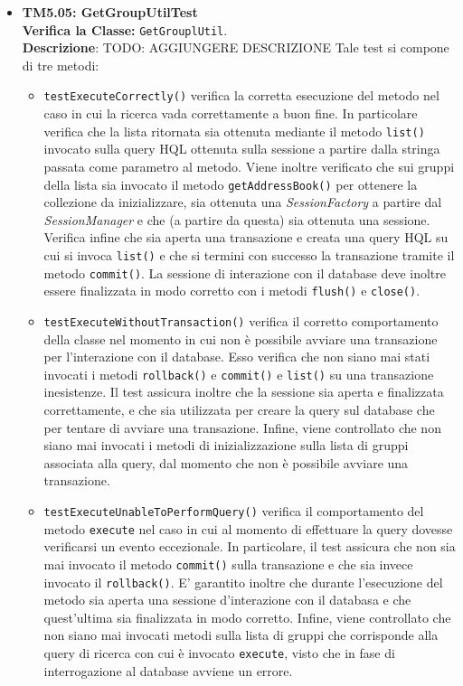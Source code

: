 \begin{itemize}
\item \textbf{TM5.05: GetGroupUtilTest}\\
\textbf{Verifica la Classe:} \texttt{GetGrouplUtil}.\\
\textbf{Descrizione}: TODO: AGGIUNGERE DESCRIZIONE
Tale test si compone di tre metodi:
\begin{itemize}
\item \texttt{testExecuteCorrectly()} verifica la corretta esecuzione del metodo nel caso in cui la ricerca vada correttamente a buon fine. In particolare verifica che la lista ritornata sia ottenuta mediante il metodo \texttt{list()} invocato sulla query HQL ottenuta sulla sessione a partire dalla stringa passata come parametro al metodo.
Viene inoltre verificato che sui gruppi della lista sia invocato il metodo \texttt{getAddressBook()} per ottenere la collezione da inizializzare, sia ottenuta una \textit{SessionFactory} a partire dal \textit{SessionManager} e che (a partire da questa) sia ottenuta una sessione.
Verifica infine che sia aperta una transazione e creata una query HQL su cui si invoca \texttt{list()} e che si termini con successo la transazione tramite il metodo \texttt{commit()}.
La sessione di interazione con il database deve inoltre essere finalizzata in modo corretto con i metodi \texttt{flush()} e \texttt{close()}.

\item \texttt{testExecuteWithoutTransaction()} verifica il corretto comportamento della classe nel momento in cui non è possibile avviare una transazione per l'interazione con il database. Esso verifica che non siano mai stati invocati i metodi \texttt{rollback()} e \texttt{commit()} e \texttt{list()} su una transazione inesistenze.
Il test assicura inoltre che la sessione sia aperta e finalizzata correttamente, e che sia utilizzata per creare la query sul database che per tentare di avviare una transazione.
Infine, viene controllato che non siano mai invocati i metodi di inizializzazione sulla lista di gruppi associata alla query, dal momento che non è possibile avviare una transazione.

\item \texttt{testExecuteUnableToPerformQuery()} verifica il comportamento del metodo \texttt{execute} nel caso in cui al momento di effettuare la query dovesse verificarsi un evento eccezionale. In particolare, il test assicura che non sia mai invocato il metodo \texttt{commit()} sulla transazione e che sia invece invocato il \texttt{rollback()}.
E' garantito inoltre che durante l'esecuzione del metodo sia aperta una sessione d'interazione con il databasa e che quest'ultima sia finalizzata in modo corretto. Infine, viene controllato che non siano mai invocati metodi sulla lista di gruppi che corrisponde alla query di ricerca con cui è invocato \texttt{execute}, visto che in fase di interrogazione al database avviene un errore.


\end{itemize}
\end{itemize}
